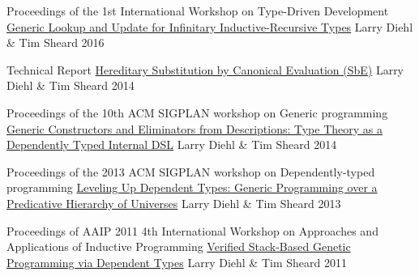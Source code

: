 

\begin{cventries}

  \cventry
    {Proceedings of the 1st International Workshop on Type-Driven Development} %
    {\href{https://github.com/larrytheliquid/infir}{Generic Lookup and Update for Infinitary Inductive-Recursive Types}} %
    {Larry Diehl \& Tim Sheard} %
    {2016} %
    {}

  \cventry
    {Technical Report} %
    {\href{https://github.com/larrytheliquid/sbe}{Hereditary Substitution by Canonical Evaluation (SbE)}} %
    {Larry Diehl \& Tim Sheard} %
    {2014} %
    {}

  \cventry
    {Proceedings of the 10th ACM SIGPLAN workshop on Generic programming} %
    {\href{https://github.com/larrytheliquid/generic-elim}{Generic Constructors and Eliminators from Descriptions: Type Theory as a Dependently Typed Internal DSL}} %
    {Larry Diehl \& Tim Sheard} %
    {2014} %
    {}


  \cventry
    {Proceedings of the 2013 ACM SIGPLAN workshop on Dependently-typed programming} %
    {\href{https://github.com/larrytheliquid/leveling-up}{Leveling Up Dependent Types: Generic Programming over a Predicative Hierarchy of Universes}} %
    {Larry Diehl \& Tim Sheard} %
    {2013} %
    {}

  \cventry
    {Proceedings of AAIP 2011 4th International Workshop on Approaches and Applications of Inductive Programming} %
    {\href{https://github.com/larrytheliquid/aaip11}{Verified Stack-Based Genetic Programming via Dependent Types}} %
    {Larry Diehl \& Tim Sheard} %
    {2011} %
    {}

\end{cventries}
